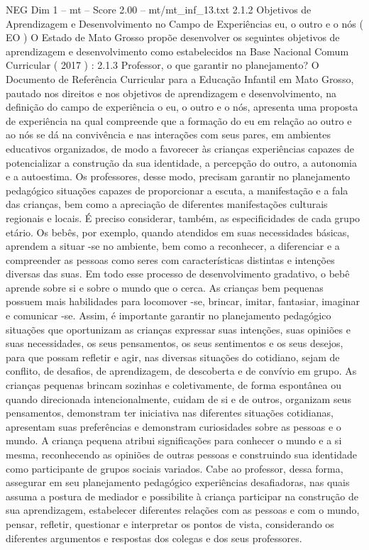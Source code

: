 \begin{textsample}{NEG Dim 1 – mt – Score 2.00 – mt/mt\_inf\_13.txt}  \label{ex:f1_neg_214}
2.1.2 Objetivos de Aprendizagem e Desenvolvimento no Campo de Experiências eu, o outro e o nós ( EO ) O Estado de Mato Grosso propõe desenvolver os seguintes objetivos de aprendizagem e desenvolvimento como estabelecidos na Base Nacional Comum Curricular ( 2017 ) : 2.1.3 Professor, o que garantir no planejamento?
O Documento de Referência Curricular para a Educação Infantil em Mato Grosso, pautado nos direitos e nos objetivos de aprendizagem e desenvolvimento, na definição do campo de experiência o eu, o outro e o nós, apresenta uma proposta de experiência na qual compreende que a formação do eu em relação ao outro e ao nós se dá na convivência e nas interações com seus pares, em ambientes educativos organizados, de modo a favorecer às crianças experiências capazes de potencializar a construção da sua identidade, a percepção do outro, a autonomia e a autoestima.
Os professores, desse modo, precisam garantir no planejamento pedagógico situações capazes de proporcionar a escuta, a manifestação e a fala das crianças, bem como a apreciação de diferentes manifestações culturais regionais e locais.
É preciso considerar, também, as especificidades de cada grupo etário.
Os bebês, por exemplo, quando atendidos em suas necessidades básicas, aprendem a situar -se no ambiente, bem como a reconhecer, a diferenciar e a compreender as pessoas como seres com características distintas e intenções diversas das suas.
Em todo esse processo de desenvolvimento gradativo, o bebê aprende sobre si e sobre o mundo que o cerca.
As crianças bem pequenas possuem mais habilidades para locomover -se, brincar, imitar, fantasiar, imaginar e comunicar -se.
Assim, é importante garantir no planejamento pedagógico situações que oportunizam as crianças expressar suas intenções, suas opiniões e suas necessidades, os seus pensamentos, os seus sentimentos e os seus desejos, para que possam refletir e agir, nas diversas situações do cotidiano, sejam de conflito, de desafios, de aprendizagem, de descoberta e de convívio em grupo.
As crianças pequenas brincam sozinhas e coletivamente, de forma espontânea ou quando direcionada intencionalmente, cuidam de si e de outros, organizam seus pensamentos, demonstram ter iniciativa nas diferentes situações cotidianas, apresentam suas preferências e demonstram curiosidades sobre as pessoas e o mundo.
A criança pequena atribui significações para conhecer o mundo e a si mesma, reconhecendo as opiniões de outras pessoas e construindo sua identidade como participante de grupos sociais variados.
Cabe ao professor, dessa forma, assegurar em seu planejamento pedagógico experiências desafiadoras, nas quais assuma a postura de mediador e possibilite à criança participar na construção de sua aprendizagem, estabelecer diferentes relações com as pessoas e com o mundo, pensar, refletir, questionar e interpretar os pontos de vista, considerando os diferentes argumentos e respostas dos colegas e dos seus professores.

\end{textsample}
